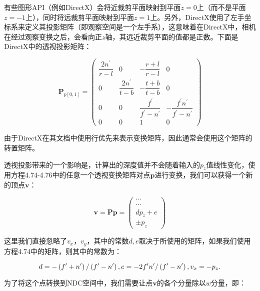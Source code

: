 \documentclass[
  paper=a4,
  ,captions=tableheading
]{scrartcl}
\begin{document}
有些图形API（例如DirectX）会将近裁剪平面映射到平面\(z=0\)上（而不是平面\(z=-1\)上），同时将远裁剪平面映射到平面\(z=1\)上。另外，DirectX使用了左手坐标系来定义其投影矩阵（即观察空间是一个左手系），这意味着在DirectX中，相机在经过观察变换之后，会看向正\(z\)轴，其远近裁剪平面的值都是正数。下面是DirectX中的透视投影矩阵：

\[
  \mathbf{P}_{p[0,1]}=
  \left(\begin{array}{cccc}\dfrac{2 n^{\prime}}{r-l} & 0                         & -\dfrac{r+l}{r-l}                         & 0                                                     \\[2mm]
             0                               & \dfrac{2 n^{\prime}}{t-b} & -\dfrac{t+b}{t-b}                         & 0                                                     \\[2mm]
             0                               & 0                         & \dfrac{f^{\prime}}{f^{\prime}-n^{\prime}} & -\dfrac{f^{\prime} n^{\prime}}{f^{\prime}-n^{\prime}} \\[2mm]
             0                               & 0                         & 1                                         & 0
    \end{array}\right)
  \tag{4.76}
\]

由于DirectX在其文档中使用行优先来表示变换矩阵，因此通常会使用这个矩阵的转置矩阵。

透视投影带来的一个影响是，计算出的深度值并不会随着输入的\(p_z\)值线性变化，使用方程4.74-4.76中的任意一个透视变换矩阵对点\(\mathbf{p}\)进行变换，我们可以获得一个新的顶点\(\mathbf{v}\)：

\[
  \mathbf{v}=\mathbf{P} \mathbf{p}=\left(\begin{array}{c}\cdots \\ \cdots \\ d p_{z}+e \\ \pm p_{z}\end{array}\right)
  \tag{4.77}
\]

这里我们直接忽略了\(v_x，v_y\)，其中的常数\(d,e\)取决于所使用的矩阵，如果我们使用方程4.74中的矩阵，则其中的常数为：

\[
  d=-\left(f^{\prime}+n^{\prime}\right) /\left(f^{\prime}-n^{\prime}\right),\\[2mm]
  e=-2 f^{\prime} n^{\prime} /\left(f^{\prime}-n^{\prime}\right),\\[2mm]
  v_{x}=-p_{z}.
\]

为了将这个点转换到NDC空间中，我们需要让点\(\mathbf{v}\)的各个分量除以\(w\)分量，即：
\end{document}
